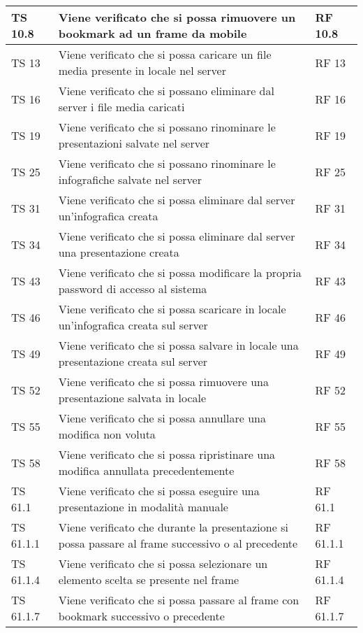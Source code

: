 {{\begin{longtable} [c]{| p{3cm} | p{6cm} |p{3cm}|}
			\hline
			TS 10.8 & Viene verificato che si possa rimuovere un bookmark\ped{g} ad un frame\ped{g} da mobile & RF 10.8\\
			\hline
			TS 13 & Viene verificato che si possa caricare un file media presente in locale nel server & RF 13\\
			\hline
			TS 16 & Viene verificato che si possano eliminare dal server\ped{g} i file media caricati & RF 16\\
			\hline
			TS 19 & Viene verificato che si possano rinominare le presentazioni salvate nel server & RF 19\\
			\hline
			TS 25 & Viene verificato che si possano rinominare le infografiche salvate nel server & RF 25\\
			\hline
			TS 31 & Viene verificato che si possa eliminare dal server un'infografica creata & RF 31\\
			\hline
			TS 34 & Viene verificato che si possa eliminare dal server\ped{g} una presentazione creata & RF 34\\
			\hline
			TS 43 & Viene verificato che si possa modificare la propria password di accesso al sistema & RF 43\\
			\hline
			TS 46 & Viene verificato che si possa scaricare in locale un'infografica\ped{g} creata sul server\ped{g} & RF 46\\
			\hline
			TS 49 & Viene verificato che si possa salvare in locale una presentazione creata sul server\ped{g} & RF 49\\
			\hline
			TS 52 & Viene verificato che si possa rimuovere una presentazione salvata in locale & RF 52\\
			\hline
			TS 55 & Viene verificato che si possa annullare una modifica non voluta & RF 55\\
			\hline
			TS 58 & Viene verificato che si possa ripristinare una modifica annullata precedentemente  & RF 58\\
			\hline
			TS 61.1 & Viene verificato che si possa eseguire una presentazione in modalità manuale & RF 61.1\\
			\hline
			TS 61.1.1 & Viene verificato che durante la presentazione si possa passare al frame\ped{g} successivo o al precedente & RF 61.1.1\\
			\hline
			TS 61.1.4 & Viene verificato che si possa selezionare un elemento scelta\ped{g} se presente nel frame\ped{g} & RF 61.1.4\\
			\hline
			TS 61.1.7 & Viene verificato che si possa passare al frame\ped{g} con bookmark\ped{g} successivo o precedente & RF 61.1.7\\

\end{longtable}}}
